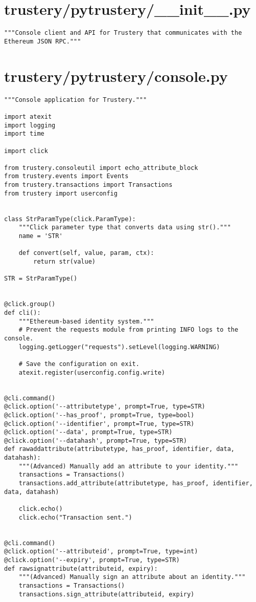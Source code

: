 \documentclass[12pt]{report}
\begin{document}
	\section{trustery/pytrustery/\_\_init\_\_.py}
	\begin{lstlisting}
"""Console client and API for Trustery that communicates with the Ethereum JSON RPC."""
	\end{lstlisting}
	
	\section{trustery/pytrustery/console.py}
	\begin{lstlisting}
"""Console application for Trustery."""

import atexit
import logging
import time

import click

from trustery.consoleutil import echo_attribute_block
from trustery.events import Events
from trustery.transactions import Transactions
from trustery import userconfig


class StrParamType(click.ParamType):
    """Click parameter type that converts data using str()."""
    name = 'STR'

    def convert(self, value, param, ctx):
        return str(value)

STR = StrParamType()


@click.group()
def cli():
    """Ethereum-based identity system."""
    # Prevent the requests module from printing INFO logs to the console.
    logging.getLogger("requests").setLevel(logging.WARNING)

    # Save the configuration on exit.
    atexit.register(userconfig.config.write)


@cli.command()
@click.option('--attributetype', prompt=True, type=STR)
@click.option('--has_proof', prompt=True, type=bool)
@click.option('--identifier', prompt=True, type=STR)
@click.option('--data', prompt=True, type=STR)
@click.option('--datahash', prompt=True, type=STR)
def rawaddattribute(attributetype, has_proof, identifier, data, datahash):
    """(Advanced) Manually add an attribute to your identity."""
    transactions = Transactions()
    transactions.add_attribute(attributetype, has_proof, identifier, data, datahash)

    click.echo()
    click.echo("Transaction sent.")


@cli.command()
@click.option('--attributeid', prompt=True, type=int)
@click.option('--expiry', prompt=True, type=STR)
def rawsignattribute(attributeid, expiry):
    """(Advanced) Manually sign an attribute about an identity."""
    transactions = Transactions()
    transactions.sign_attribute(attributeid, expiry)


\end{lstlisting}
\end{document}
